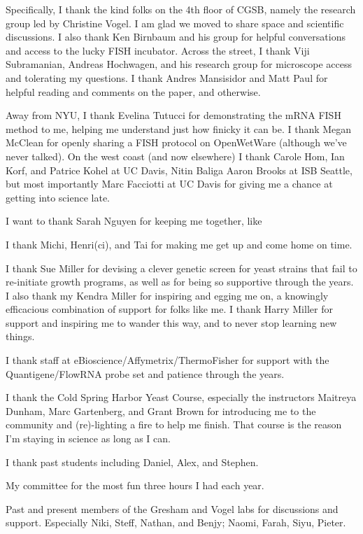 \documentclass[12pt,letterpaper]{memoir}
\begin{document}
Specifically,
I thank the kind folks on the 4th floor of CGSB, namely
the research group led by Christine Vogel. I am glad we moved to share
space and scientific discussions.
I also thank Ken Birnbaum and his group for helpful conversations and
access to the lucky FISH incubator.
Across the street, I thank Viji Subramanian, Andreas Hochwagen, 
and his research group for microscope access and tolerating my
questions.
I thank Andres Mansisidor and Matt Paul for helpful reading and 
comments on the paper, and otherwise.

Away from NYU, I thank
Evelina Tutucci for demonstrating the mRNA FISH method to me,
helping me understand just how finicky it can be.
I thank Megan McClean for openly sharing a FISH protocol on
OpenWetWare (although we've never talked).
On the west coast (and now elsewhere) I thank Carole Hom, Ian Korf, 
and Patrice Kohel at UC Davis, Nitin Baliga Aaron Brooks at ISB
Seattle, but most importantly Marc Facciotti at UC Davis for 
giving me a chance at getting into science late.

I want to thank Sarah Nguyen for keeping me together, like 

I thank Michi, Henri(ci), and Tai for making me get up and come 
home on time.


I thank Sue Miller for devising a clever genetic screen for yeast
strains that fail to re-initiate growth programs, as well as for
being so supportive through the years.
I also thank my Kendra Miller for inspiring and egging me on, 
a knowingly efficacious combination of support for folks like me.
I thank Harry Miller for support and inspiring me to wander this way,
and to never stop learning new things.

I thank staff at eBioscience/Affymetrix/ThermoFisher for support with
the Quantigene/FlowRNA probe set and patience through the years.

I thank the Cold Spring Harbor Yeast Course, especially the instructors
Maitreya Dunham, Marc Gartenberg, and Grant Brown for introducing
me to the community and (re)-lighting a fire to help me finish.
That course is the reason I'm staying in science as long as I can.

I thank past students including Daniel, Alex, and Stephen.

My committee for the most fun three hours I had each year.

Past and present members of the Gresham and Vogel labs for 
discussions and support.
Especially Niki, Steff, Nathan, and Benjy; Naomi, Farah, Siyu,
Pieter.
\end{document}
